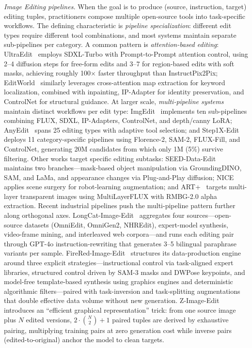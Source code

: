 \documentclass{llmxive}
\begin{document}
\emph{Image Editing pipelines.}
When the goal is to produce (source, instruction, target) editing tuples, practitioners compose multiple open-source tools into task-specific workflows. The defining characteristic is \emph{pipeline specialization}: different edit types require different tool combinations, and most systems maintain separate sub-pipelines per category. A common pattern is \emph{attention-based editing}: UltraEdit~\citep{zhao2024ultraedit} employs SDXL-Turbo with Prompt-to-Prompt attention control, using 2--4 diffusion steps for free-form edits and 3--7 for region-based edits with soft masks, achieving roughly 100$\times$ faster throughput than InstructPix2Pix; EditWorld~\citep{zeng2025editworld} similarly leverages cross-attention map extraction for keyword localization, combined with inpainting, IP-Adapter for identity preservation, and ControlNet for structural guidance. At larger scale, \emph{multi-pipeline systems} maintain distinct workflows per edit type: ImgEdit~\citep{ye2025imgedit} implements ten sub-pipelines combining FLUX, SDXL, IP-Adapters, ControlNet, and depth/canny LoRA; AnyEdit~\citep{yu2025anyedit} spans 25 editing types with adaptive tool selection; and Step1X-Edit~\citep{liu2025step1x} deploys 11 category-specific pipelines using Florence-2, SAM-2, FLUX-Fill, and ControlNet, generating 20M candidates from which only 1M (5\%) survive filtering. Other works target specific editing subtasks: SEED-Data-Edit~\citep{ge2024seed} maintains two branches---mask-based object manipulation via GroundingDINO, SAM, and LaMa, and appearance changes via Plug-and-Play diffusion; NICE~\citep{pakdamansavoji2025improving} applies scene surgery for robot-learning augmentation; and ART+~\citep{pu2025art} targets multi-layer transparent images using MultiLayerFLUX with RMBG-2.0 alpha extraction. Recent industrial pipelines push the multi-pipeline pattern further along orthogonal axes. LongCat-Image-Edit~\citep{team2025longcat} aggregates four sources---open-source datasets (OmniEdit, OmniGen2, NHREdit), expert-model synthesis, video-frame mining, and interleaved web corpora---and runs each editing pair through GPT-4o instruction-rewriting that generates 3--5 bilingual paraphrase variants per sample. FireRed-Image-Edit~\citep{team2026firered} structures its data-production engine around three explicit strategies---instructional control via task-aligned expert libraries, structured control driven by SAM-3 masks and DWPose keypoints, and model-free template-based synthesis using graphics engines and deterministic algorithmic filters---paired with task-inversion and task-splitting augmentations that double effective data volume without new generation. Z-Image-Edit~\citep{cai2025z} introduces an ``efficient graphical representation'' trick: from one source image plus $N$ edited versions, $2\cdot\binom{N}{2}+1$ paired tuples are derived by exhaustive pairing, multiplying training pairs at zero generation cost while inverse pairs (edited-to-original) anchor the model to clean targets.
\end{document}
